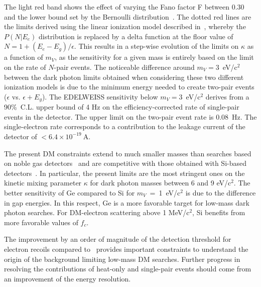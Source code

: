 \documentclass[aps,nofootinbib,floatfix,showpacs,preprintnumbers,twocolumn,superscriptaddress]{revtex4}
\begin{document}
The light red band shows the effect of varying the Fano factor F between 0.30 and the lower bound set by the Bernoulli distribution~\cite{COMPoisson}. The dotted red lines are the limits derived using the linear ionization model described in~\cite{Essig2016}, whereby the $P(N|E_e)$ distribution is replaced by a delta function at the floor value of $N=1+(E_e-E_g)/\epsilon$.
This results in a step-wise evolution of the limits on $\kappa$ as a function of $m_V$, as the sensitivity for a given mass is entirely based on the limit on the rate of $N$-pair events. The noticeable difference around $m_V=3$~eV/$\mathrm{c}^2$ between the dark photon limits obtained when considering these two different ionization models is due to the minimum energy needed to create two-pair events ($\epsilon$ vs. $\epsilon+E_g$).
The EDELWEISS sensitivity below $m_V=3$~eV/$\mathrm{c}^2$ derives from a 90\%~C.L. upper bound of 4 Hz on the efficiency-corrected rate of single-pair events in the detector. The upper limit on the two-pair event rate is 0.08~Hz.
The single-electron rate corresponds to a contribution to the leakage current of the detector of $<6.4\times10^{-19}~\mathrm{A}$.

The present DM constraints extend to much smaller masses than searches based on noble gas detectors~\cite{Xenon10-DP,Darkside} and are competitive with those obtained with Si-based detectors~\cite{SENSEI@MINOS,DAMIC-2019,CDMS-2019-erratum}.
In particular, the present limits are the most stringent ones on the kinetic mixing parameter $\kappa$ for dark photon masses between 6 and 9 eV/$\mathrm{c}^2$.
The better sensitivity of Ge compared to Si for $m_V$~=~1~eV/c$^2$ is due to the difference in gap energies.
In this respect, Ge is a more favorable target for low-mass dark photon searches. For DM-electron scattering above 1 MeV/$\mathrm{c}^2$, Si benefits from more favorable values of $f_c$.

The improvement by an order of magnitude of the detection threshold for electron recoils compared to~\cite{RED20} provides important constraints to understand the origin of the background limiting low-mass DM searches. Further progress in resolving the contributions of heat-only and single-pair events should come from an improvement of the energy resolution.
\end{document}
